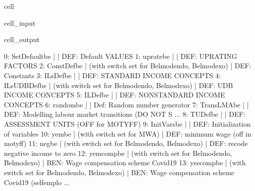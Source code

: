 \documentclass[letterpaper,10pt,english]{sphinxmanual}
\begin{document}
\begin{sphinxuseclass}{cell}
\begin{sphinxuseclass}{cell_input}
\begin{sphinxVerbatim}[commandchars=\\\{\}]
\PYG{p}{[}\PYG{p}{]}
\end{sphinxVerbatim}

\end{sphinxuseclass}
\begin{sphinxuseclass}{cell_output}
\begin{sphinxVerbatim}[commandchars=\\\{\}]
0: SetDefault\PYGZus{}be         |                                                       |    DEF: Default VALUES 
1: uprate\PYGZus{}be             |                                                       |    DEF: UPRATING FACTORS 
2: ConstDef\PYGZus{}be           |  (with switch set for Belmod\PYGZus{}endo, Belmod\PYGZus{}exo)        |    DEF: Constants 
3: ILsDef\PYGZus{}be             |                                                       |    DEF: STANDARD INCOME CONCEPTS 
4: ILsUDBDef\PYGZus{}be          |  (with switch set for Belmod\PYGZus{}endo, Belmod\PYGZus{}exo)        |    DEF: UDB INCOME CONCEPTS 
5: ILDef\PYGZus{}be              |                                                       |    DEF: NON\PYGZhy{}STANDARD INCOME CONCEPTS 
6: random\PYGZus{}be             |                                                       |    Def: Random number generator 
7: TransLMA\PYGZus{}be           |                                                       |    DEF: Modelling labour market transitions (DO NOT S ... 
8: TUDef\PYGZus{}be              |                                                       |    DEF: ASSESSMENT UNITS (OFF for MOTYFF) 
9: InitVars\PYGZus{}be           |                                                       |    DEF: Initialization of variables 
10: yem\PYGZus{}be               |  (with switch set for MWA)                            |    DEF: minimum wage  (off in motyff) 
11: neg\PYGZus{}be               |  (with switch set for Belmod\PYGZus{}endo, Belmod\PYGZus{}exo)        |    DEF: recode negative income to zero 
12: yemcomp\PYGZus{}be           |  (with switch set for Belmod\PYGZus{}endo, Belmod\PYGZus{}exo)        |    BEN: Wage compensation scheme Covid\PYGZhy{}19 
13: ysecomp\PYGZus{}be           |  (with switch set for Belmod\PYGZus{}endo, Belmod\PYGZus{}exo)        |    BEN: Wage compensation scheme Covid\PYGZhy{}19 (self\PYGZhy{}emplo ... 

\end{sphinxVerbatim}
\end{sphinxuseclass}
\end{sphinxuseclass}
\end{document}

